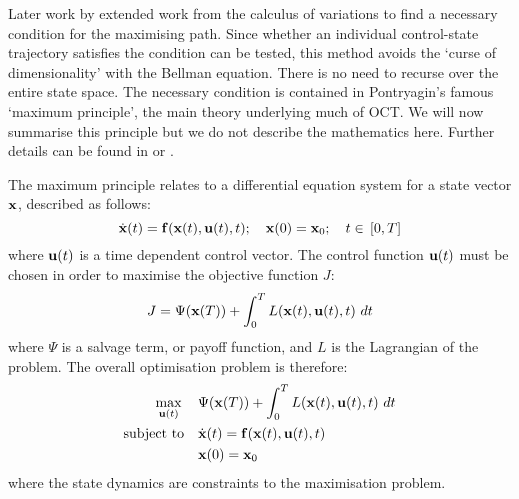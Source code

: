 Later work by \citet{pontryagin_mathematical_1962} extended work from the calculus of variations to find a necessary condition for the maximising path. Since whether an individual control-state trajectory satisfies the condition can be tested, this method avoids the `curse of dimensionality' with the Bellman equation. There is no need to recurse over the entire state space. The necessary condition is contained in Pontryagin's famous `maximum principle', the main theory underlying much of OCT\@. We will now summarise this principle but we do not describe the mathematics here. Further details can be found in \citet{lenhart_optimal_2007} or \citet{hocking_optimal_1991}.

The maximum principle relates to a differential equation system for a state vector $\mathbf{\bm{x}}$, described as follows:
\begin{equation}\label{eqn:ch2:state_system}
    \dot{\mathbf{\bm{x}}}(t) = \mathbf{\bm{f}}(\mathbf{\bm{x}}(t), \mathbf{\bm{u}}(t), t);\quad{}\mathbf{\bm{x}}(0)=\mathbf{\bm{x}}_0;\quad{}t\in{}\left[0, T\right]
\end{equation}
where $\mathbf{\bm{u}}(t)$ is a time dependent control vector. The control function $\mathbf{\bm{u}}(t)$ must be chosen in order to maximise the objective function $J$:
\begin{equation}\label{eqn:ch2:objective}
    J = \Psi{}(\mathbf{\bm{x}}(T)) + \int_0^TL(\mathbf{\bm{x}}(t), \mathbf{\bm{u}}(t), t)\,\mathop{dt}
\end{equation}
where $\Psi$ is a salvage term, or payoff function, and $L$ is the Lagrangian of the problem. The overall optimisation problem is therefore:
\begin{subequations}\label{eqn:ch2:opt_problem}
    \begin{align}
        \max_{\vect{u}(t)} \quad{} &\null \Psi{}(\vect{x}(T)) + \int_0^TL(\vect{x}(t), \vect{u}(t), t)\,\mathop{dt} \label{eqn:ch2:opt_problem_a}\\
        \text{subject to} \quad{} &\null \dot{\vect{x}}(t) = \vect{f}(\vect{x}(t), \vect{u}(t), t) \label{eqn:ch2:opt_problem_b}\\
        &\null \vect{x}(0)=\vect{x}_0 \label{eqn:ch2:opt_problem_c}
    \end{align}
\end{subequations}
where the state dynamics are constraints to the maximisation problem.

